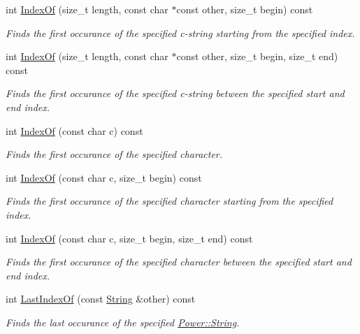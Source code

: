 \begin{DoxyCompactItemize}
int \hyperlink{class_power_1_1_string_aecff21ff789251b0dcda23a4f2797db2}{Index\+Of} (size\+\_\+t length, const char $\ast$const other, size\+\_\+t begin) const
\begin{DoxyCompactList}\small\item\em Finds the first occurance of the specified c-\/string starting from the specified index. \end{DoxyCompactList}\item 
int \hyperlink{class_power_1_1_string_a6dbad87edb4036a9463399cfea31a14c}{Index\+Of} (size\+\_\+t length, const char $\ast$const other, size\+\_\+t begin, size\+\_\+t end) const
\begin{DoxyCompactList}\small\item\em Finds the first occurance of the specified c-\/string between the specified start and end index. \end{DoxyCompactList}\item 
int \hyperlink{class_power_1_1_string_af1bd7ca5bdef376538e580fd61d7fb1d}{Index\+Of} (const char c) const
\begin{DoxyCompactList}\small\item\em Finds the first occurance of the specified character. \end{DoxyCompactList}\item 
int \hyperlink{class_power_1_1_string_aafddc2ae8eeb214985e63ccb0aef162c}{Index\+Of} (const char c, size\+\_\+t begin) const
\begin{DoxyCompactList}\small\item\em Finds the first occurance of the specified character starting from the specified index. \end{DoxyCompactList}\item 
int \hyperlink{class_power_1_1_string_acbdc3ba090c08065559d9ab32b753e27}{Index\+Of} (const char c, size\+\_\+t begin, size\+\_\+t end) const
\begin{DoxyCompactList}\small\item\em Finds the first occurance of the specified character between the specified start and end index. \end{DoxyCompactList}\item 
int \hyperlink{class_power_1_1_string_a5a87bca075e813615b7a547fa9a92b65}{Last\+Index\+Of} (const \hyperlink{class_power_1_1_string}{String} \&other) const
\begin{DoxyCompactList}\small\item\em Finds the last occurance of the specified \hyperlink{class_power_1_1_string}{Power\+::\+String}. \end{DoxyCompactList}\item 

\end{DoxyCompactItemize}
